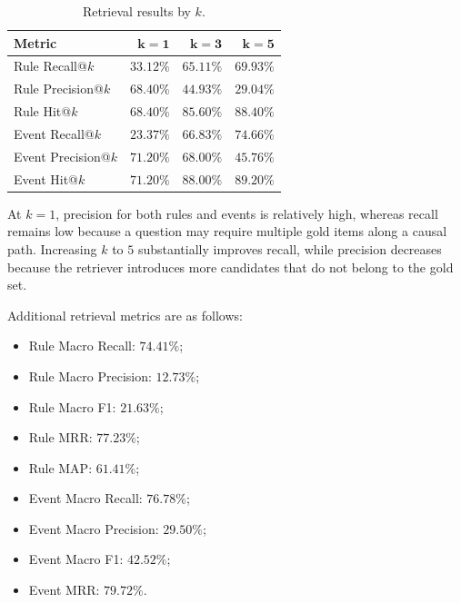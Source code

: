 \begin{table}[t]
    \centering
    \caption{Retrieval results by \(k\).}
    \label{tab:retrieval-results}
    \begin{tabular}{lrrr}
        \hline
        \textbf{Metric} & \(\mathbf{k=1}\) & \(\mathbf{k=3}\) &
        \(\mathbf{k=5}\) \\
        \hline
        Rule Recall@\(k\) &
        \(33.12\%\) & \(65.11\%\) & \(69.93\%\) \\
        Rule Precision@\(k\) &
        \(68.40\%\) & \(44.93\%\) & \(29.04\%\) \\
        Rule Hit@\(k\) &
        \(68.40\%\) & \(85.60\%\) & \(88.40\%\) \\
        \hline
        Event Recall@\(k\) &
        \(23.37\%\) & \(66.83\%\) & \(74.66\%\) \\
        Event Precision@\(k\) &
        \(71.20\%\) & \(68.00\%\) & \(45.76\%\) \\
        Event Hit@\(k\) &
        \(71.20\%\) & \(88.00\%\) & \(89.20\%\) \\
        \hline
    \end{tabular}
\end{table}

At \(k=1\), precision for both rules and events is relatively high, whereas
recall remains low because a question may require multiple gold items along
a causal path. Increasing \(k\) to \(5\) substantially improves recall,
while precision decreases because the retriever introduces more candidates
that do not belong to the gold set.

Additional retrieval metrics are as follows:

\begin{itemize}
    \item Rule Macro Recall: \(74.41\%\);
    \item Rule Macro Precision: \(12.73\%\);
    \item Rule Macro F1: \(21.63\%\);
    \item Rule MRR: \(77.23\%\);
    \item Rule MAP: \(61.41\%\);
    \item Event Macro Recall: \(76.78\%\);
    \item Event Macro Precision: \(29.50\%\);
    \item Event Macro F1: \(42.52\%\);
    \item Event MRR: \(79.72\%\).
\end{itemize}

